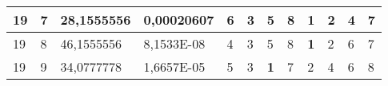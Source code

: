 \documentclass[conference]{IEEEtran}
\begin{document}
\begin{table*}[]
\begin{tabular}{|llll|llllllll|}
\multicolumn{1}{|l|}{19}                                                    & \multicolumn{1}{l|}{7}                                                        & \multicolumn{1}{l|}{28,1555556}                                                   & 0,00020607                     & \multicolumn{1}{l|}{6}                                                  & \multicolumn{1}{l|}{3}                                                  & \multicolumn{1}{l|}{5}                                                  & \multicolumn{1}{l|}{8}                                                  & \multicolumn{1}{l|}{\textbf{1}}                                         & \multicolumn{1}{l|}{2}                                                  & \multicolumn{1}{l|}{4}                                                  & 7                          \\ \hline
\multicolumn{1}{|l|}{19}                                                    & \multicolumn{1}{l|}{8}                                                        & \multicolumn{1}{l|}{46,1555556}                                                   & 8,1533E-08                     & \multicolumn{1}{l|}{4}                                                  & \multicolumn{1}{l|}{3}                                                  & \multicolumn{1}{l|}{5}                                                  & \multicolumn{1}{l|}{8}                                                  & \multicolumn{1}{l|}{\textbf{1}}                                         & \multicolumn{1}{l|}{2}                                                  & \multicolumn{1}{l|}{6}                                                  & 7                          \\ \hline
\multicolumn{1}{|l|}{19}                                                    & \multicolumn{1}{l|}{9}                                                        & \multicolumn{1}{l|}{34,0777778}                                                   & 1,6657E-05                     & \multicolumn{1}{l|}{5}                                                  & \multicolumn{1}{l|}{3}                                                  & \multicolumn{1}{l|}{\textbf{1}}                                         & \multicolumn{1}{l|}{7}                                                  & \multicolumn{1}{l|}{2}                                                  & \multicolumn{1}{l|}{4}                                                  & \multicolumn{1}{l|}{6}                                                  & 8                          \\ \hline

\end{tabular}
\end{table*}
\end{document}
